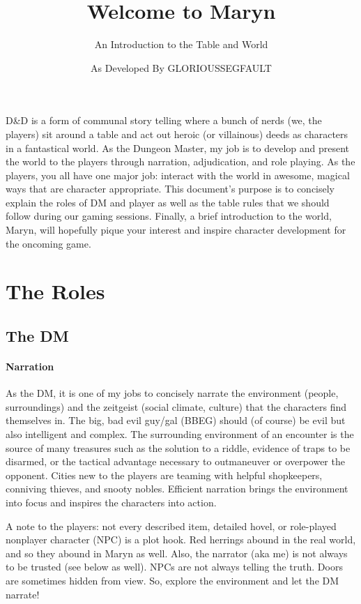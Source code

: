 \documentclass[12pt]{article}
\title{Welcome to Maryn}
\author{An Introduction to the Table and World}
\date{As Developed By GLORIOUSSEGFAULT}
\begin{document}
\maketitle

\textsf{D\&D is a form of communal story telling where a bunch of nerds (we, the players) sit around a table and act out heroic (or villainous) deeds as characters in a fantastical world. As the Dungeon Master, my job is to develop and present the world to the players through narration, adjudication, and role playing. As the players, you all have one major job: interact with the world in awesome, magical ways that are character appropriate. This document's purpose is to concisely explain the roles of DM and player as well as the table rules that we should follow during our gaming sessions. Finally, a brief introduction to the world, Maryn, will hopefully pique your interest and inspire character development for the oncoming game.}

\section{The Roles}
\subsection*{The DM}
\paragraph{\textsf{Narration}}
\textsf{As the DM, it is one of my jobs to concisely narrate the environment (people, surroundings) and the zeitgeist (social climate, culture) that the characters find themselves in. The big, bad evil guy/gal (BBEG) should (of course) be evil but also intelligent and complex. The surrounding environment of an encounter is the source of many treasures such as the solution to a riddle, evidence of traps to be disarmed, or the tactical advantage necessary to outmaneuver or overpower the opponent. Cities new to the players are teaming with helpful shopkeepers, conniving thieves, and snooty nobles. Efficient narration brings the environment into focus and inspires the characters into action.}

\textsf{A note to the players: not every described item, detailed hovel, or role-played nonplayer character (NPC) is a plot hook. Red herrings abound in the real world, and so they abound in Maryn as well. Also, the narrator (aka me) is not always to be trusted (see below as well). NPCs are not always telling the truth. Doors are sometimes hidden from view. So, explore the environment and let the DM narrate!}
\end{document}
